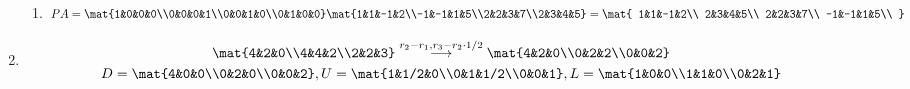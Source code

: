 \documentclass{article}
\begin{document}
\begin{enumerate}
{\begin{enumerate}
{                }
                \item {
                    \begin{displaymath}
                        PA =
                        \mat{1&0&0&0\\0&0&0&1\\0&0&1&0\\0&1&0&0}
                        \mat{1&1&-1&2\\-1&-1&1&5\\2&2&3&7\\2&3&4&5} =
                        \mat{
                            1&1&-1&2\\
                            2&3&4&5\\
                            2&2&3&7\\
                            -1&-1&1&5\\
                        }
                    \end{displaymath}
                }
            \end{enumerate}
        }
        \item {
            \begin{displaymath}
                \begin{gathered}
                    \mat{4&2&0\\4&4&2\\2&2&3}
                    \overset{r_2-r_1, r_3-r_2\cdot1/2}{\longrightarrow}
                    \mat{4&2&0\\0&2&2\\0&0&2}\\
                    D = \mat{4&0&0\\0&2&0\\0&0&2},
                    U = \mat{1&1/2&0\\0&1&1/2\\0&0&1},
                    L = \mat{1&0&0\\1&1&0\\0&2&1}
                \end{gathered}
            \end{displaymath}
        }
    \end{enumerate}
\end{document}
